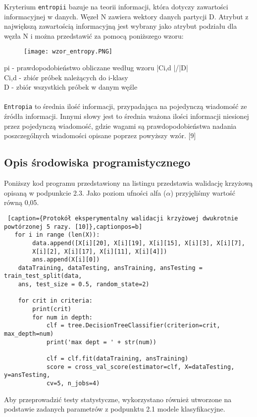 \documentclass{article}
\begin{document}
Kryterium \texttt{entropii} bazuje na teorii informacji, która dotyczy zawartości informacyjnej w danych. Węzeł N zawiera wektory danych partycji D. Atrybut z największą zawartością informacyjną jest wybrany jako atrybut podziału dla węzła N i można przedstawić za pomocą poniższego wzoru:
\begin{figure}[ht]
    \centering
    \noindent 
    \vspace{.2cm}
    \texttt{[image: wzor\_entropy.PNG]}
    \label{fig:entropy}
\end{figure}

p{\tiny i} - prawdopodobieństwo obliczane według wzoru |C{\tiny i,d} |/|D| \\
C{\tiny i,d} - zbiór próbek należących do i-klasy\\
D - zbiór wszystkich próbek w danym węźle\\\\

\texttt{Entropia} to średnia ilość informacji, przypadająca na pojedynczą wiadomość ze źródła informacji. Innymi słowy jest to średnia ważona ilości informacji niesionej przez pojedynczą wiadomość, gdzie wagami są prawdopodobieństwa nadania poszczególnych wiadomości opisane poprzez powyższy wzór. [9]

\newpage

\subsection{Opis środowiska programistycznego}

\quad Poniższy kod programu przedstawiony na listingu przedstawia walidację krzyżową opisaną w podpunkcie 2.3. Jako poziom ufności alfa ($\alpha$) przyjęliśmy wartość równą 0,05.\\

\begin{lstlisting} [caption={Protokół eksperymentalny walidacji krzyżowej dwukrotnie powtórzonej 5 razy. [10]},captionpos=b]
   for i in range (len(X)):
        data.append([X[i][20], X[i][19], X[i][15], X[i][3], X[i][7], 
        X[i][2], X[i][17], X[i][11], X[i][4]])
        ans.append(X[i][0])
    dataTraining, dataTesting, ansTraining, ansTesting = train_test_split(data, 
    ans, test_size = 0.5, random_state=2)

    for crit in criteria:
        print(crit)
        for num in depth: 
            clf = tree.DecisionTreeClassifier(criterion=crit, max_depth=num) 
            print('max dept = ' + str(num))

            clf = clf.fit(dataTraining, ansTraining)
            score = cross_val_score(estimator=clf, X=dataTesting, y=ansTesting, 
            cv=5, n_jobs=4)

\end{lstlisting}
Aby przeprowadzić testy statystyczne, wykorzystano również utworzone na podstawie zadanych parametrów z podpunktu 2.1 modele klasyfikacyjne.
\end{document}
